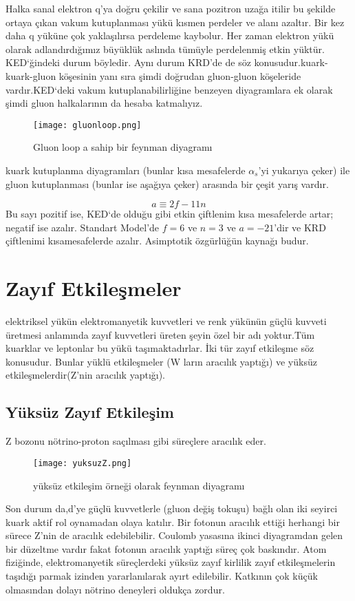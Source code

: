 \par Halka sanal elektron q'ya doğru çekilir ve sana pozitron uzağa itilir bu şekilde ortaya çıkan vakum kutuplanması yükü kısmen perdeler ve alanı azaltır. Bir kez daha q yüküne çok yaklaşılırsa perdeleme kaybolur. Her zaman elektron yükü olarak adlandırdığımız büyüklük aslında tümüyle perdelenmiş etkin yüktür. KED`ğindeki durum böyledir. Aynı durum KRD'de de söz konusudur.kuark-kuark-gluon köşesinin yanı sıra şimdi doğrudan gluon-gluon köşeleride vardır.KED`deki vakum kutuplanabilirliğine benzeyen diyagramlara ek olarak şimdi gluon halkalarının da hesaba katmalıyız.
\begin{figure}[!htbp]
\centering
\texttt{[image: gluonloop.png]}
\caption{Gluon loop a sahip bir feynman diyagramı}
\label{fig:gluonloop}
\end{figure}
kuark kutuplanma diyagramları (bunlar kısa mesafelerde $\alpha_s$'yi yukarıya çeker) ile gluon kutuplanması (bunlar ise aşağıya çeker) arasında bir çeşit yarış vardır.

\begin{equation}
a\equiv 2f - 11 n
\end{equation}
Bu sayı pozitif ise, KED`de olduğu gibi etkin çiftlenim kısa mesafelerde artar; negatif ise azalır. Standart Model'de $f=6$ ve $n=3$ ve $a=-21$'dir ve KRD çiftlenimi kısamesafelerde azalır. Asimptotik özgürlüğün kaynağı budur.

\section{Zayıf Etkileşmeler}
elektriksel yükün elektromanyetik kuvvetleri ve renk yükünün güçlü kuvveti üretmesi anlamında zayıf kuvvetleri üreten şeyin özel bir adı yoktur.Tüm kuarklar ve leptonlar bu yükü taşımaktadırlar. İki tür zayıf etkileşme söz konusudur. Bunlar yüklü etkileşmeler (W ların aracılık yaptığı) ve yüksüz etkileşmelerdir(Z'nin aracılık yaptığı).
\subsection{Yüksüz Zayıf Etkileşim}
Z bozonu nötrino-proton saçılması gibi süreçlere aracılık eder.
\begin{figure}[!htbp]
\centering
\texttt{[image: yuksuzZ.png]}
\caption{yüksüz etkileşim örneği olarak feynman diyagramı}
\end{figure}
Son durum da,d'ye güçlü kuvvetlerle (gluon değiş tokuşu) bağlı olan  iki seyirci kuark aktif rol oynamadan olaya katılır. Bir fotonun aracılık ettiği herhangi bir sürece Z'nin de aracılık edebilebilir. Coulomb yasasına ikinci diyagramdan gelen bir düzeltme vardır fakat fotonun aracılık yaptığı süreç çok baskındır. Atom fiziğinde, elektromanyetik süreçlerdeki yüksüz zayıf kirlilik zayıf etkileşmelerin taşıdığı parmak izinden yararlanılarak ayırt edilebilir. Katkının çok küçük olmasından dolayı nötrino deneyleri oldukça zordur.
